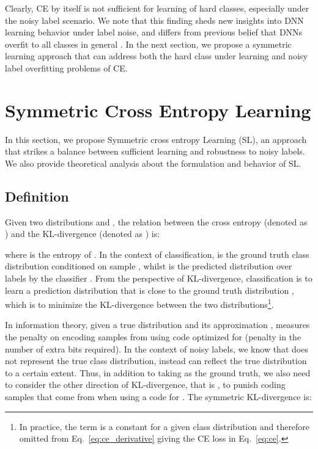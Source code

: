 \documentclass[10pt,twocolumn,letterpaper]{article}
\begin{document}
Clearly, CE by itself is not sufficient for learning of hard classes, especially under the noisy label scenario. We note that this finding sheds new insights into DNN learning behavior under label noise, and differs from previous belief that DNNs overfit to all classes in general \cite{arpit2017closer,zhang2016understanding}. In the next section, we propose a symmetric learning approach that can address both the hard class under learning and noisy label overfitting problems of CE.

\section{Symmetric Cross Entropy Learning}\label{sec:sce}
In this section, we propose Symmetric cross entropy Learning (SL), an approach that strikes a balance between sufficient learning and robustness to noisy labels.  We also provide theoretical analysis about the formulation and behavior of SL.

\subsection{Definition}
Given two distributions  and , the relation between the cross entropy (denoted as ) and the KL-divergence (denoted as ) is:

where  is the entropy of . In the context of classification,  is the ground truth class distribution conditioned on sample , whilst  is the predicted distribution over labels by the classifier . From the perspective of KL-divergence, classification is to learn a prediction distribution  that is close to the ground truth distribution , which is to minimize the KL-divergence  between the two distributions\footnote{In practice, the  term is a constant for a given class distribution and therefore omitted from Eq.~\eqref{eq:ce_derivative} giving the CE loss in Eq.~\eqref{eq:ce}.}.

In information theory, given a true distribution  and its approximation ,  measures the penalty on encoding samples from  using code optimized for  (penalty in the number of extra bits required). In the context of noisy labels, we know that  does not represent the true class distribution, instead  can reflect the true distribution to a certain extent. Thus, in addition to taking  as the ground truth, we also need to consider the other direction of KL-divergence, that is , to punish coding samples that come from  when using a code for . The symmetric KL-divergence is:
\end{document}
